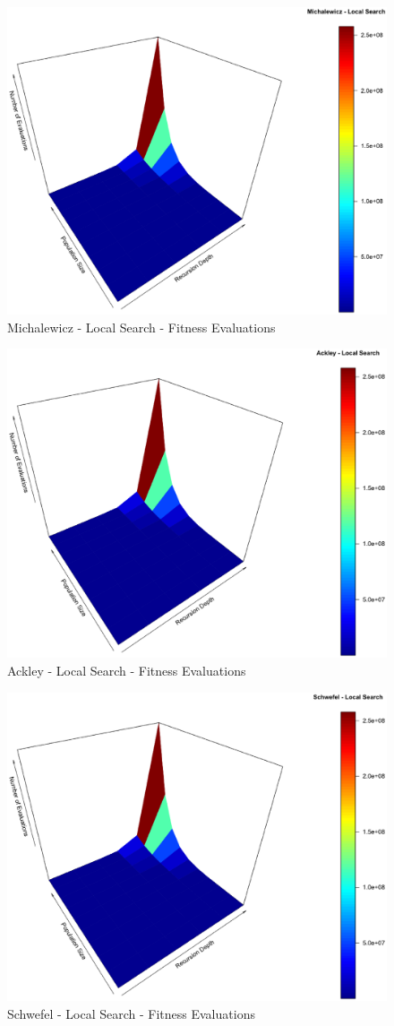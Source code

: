 \documentclass[conference]{IEEEtran}
\begin{document}
\begin{figure}[tbp]
\centering
\includegraphics[width=1.0\hsize,height=0.65\hsize]{fig04.eps}
\caption{Michalewicz - Local Search - Fitness Evaluations}
\label{fig21}
\end{figure}

\begin{figure}[tbp]
\centering
\includegraphics[width=1.0\hsize,height=0.65\hsize]{fig07.eps}
\caption{Ackley - Local Search - Fitness Evaluations}
\label{fig22}
\end{figure}

\begin{figure}[tbp]
\centering
\includegraphics[width=1.0\hsize,height=0.65\hsize]{fig10.eps}
\caption{Schwefel - Local Search - Fitness Evaluations}
\label{fig23}
\end{figure}
\end{document}
